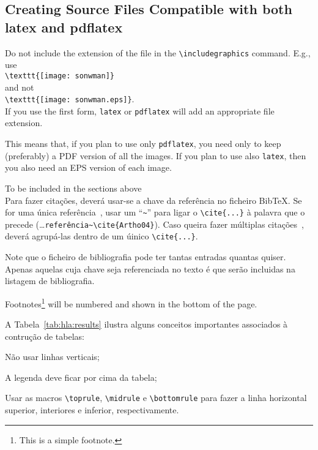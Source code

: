 \subsection{Creating Source Files Compatible with both latex and pdflatex} %
\label{ssec:creating_source_files_compatible_with_both_latex_and_pdflatex}

Do not include the extension of the file in the \verb!\includegraphics! command. E.g., use\\
\verb!\texttt{[image: sonwman]}!\\
and not\\
\verb!\texttt{[image: sonwman.eps]}!.\\
If you use the first form, \verb!latex! or \verb!pdflatex! will add an appropriate file extension.

This means that, if you plan to use only \verb!pdflatex!, you need only to keep (preferably) a PDF version of all the images. If you plan to use also \verb!latex!, then you also need an EPS version of each image.



\newpage

{\Large To be included in the sections above}\\

Para fazer citações, deverá usar-se a chave da referência no ficheiro BibTeX. Se for uma única referência~\cite{Artho04}, usar um ``\verb!~!'' para ligar o \verb!\cite{...}! à palavra que o precede (\ldots\verb!referência~\cite{Artho04}!).  Caso queira fazer múltiplas citações~\cite{Shavit95,Silberschatz06,Moss85}, deverá agrupá-las dentro de um úinico \verb!\cite{...}!.

Note que o ficheiro de bibliografia pode ter tantas entradas quantas quiser. Apenas aquelas cuja chave seja referenciada no texto é que serão incluidas na listagem de bibliografia.


Footnotes\footnote{This is a simple footnote.} will be numbered and shown in the bottom of the page.


A Tabela~\ref{tab:hla:results} ilustra alguns conceitos importantes associados à contrução de tabelas:
\begin{asparaenum}[i)]
	\item Não usar linhas verticais;
	\item A legenda deve ficar por cima da tabela;
	\item Usar as macros \verb!\toprule!, \verb!\midrule! e \verb!\bottomrule! para fazer a linha horizontal superior, interiores e inferior, respectivamente.
\end{asparaenum}
 
